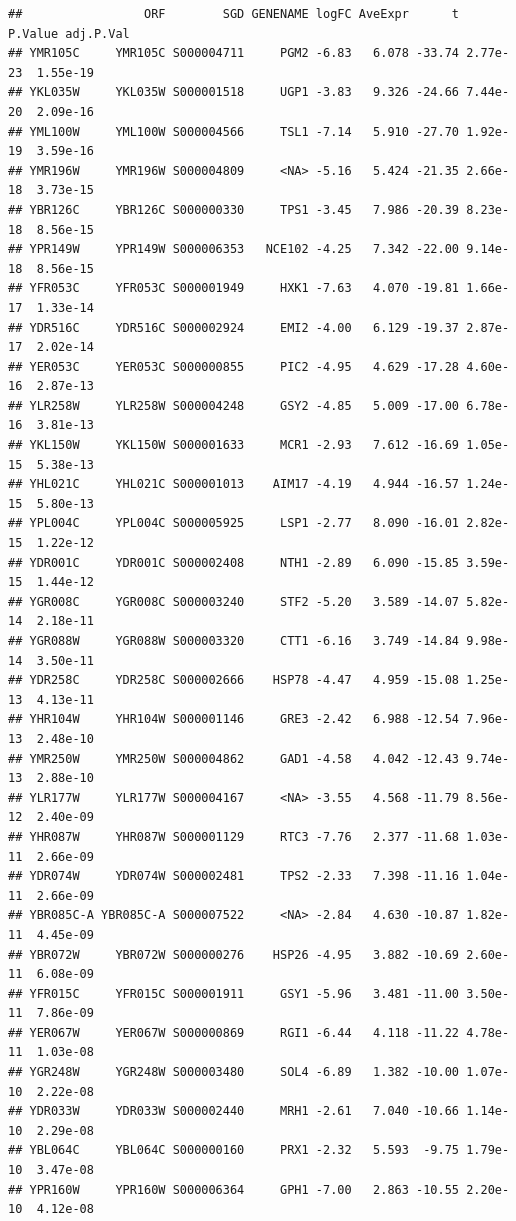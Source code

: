 \documentclass[
]{book}
\begin{document}
\begin{verbatim}
##                 ORF        SGD GENENAME logFC AveExpr      t  P.Value adj.P.Val
## YMR105C     YMR105C S000004711     PGM2 -6.83   6.078 -33.74 2.77e-23  1.55e-19
## YKL035W     YKL035W S000001518     UGP1 -3.83   9.326 -24.66 7.44e-20  2.09e-16
## YML100W     YML100W S000004566     TSL1 -7.14   5.910 -27.70 1.92e-19  3.59e-16
## YMR196W     YMR196W S000004809     <NA> -5.16   5.424 -21.35 2.66e-18  3.73e-15
## YBR126C     YBR126C S000000330     TPS1 -3.45   7.986 -20.39 8.23e-18  8.56e-15
## YPR149W     YPR149W S000006353   NCE102 -4.25   7.342 -22.00 9.14e-18  8.56e-15
## YFR053C     YFR053C S000001949     HXK1 -7.63   4.070 -19.81 1.66e-17  1.33e-14
## YDR516C     YDR516C S000002924     EMI2 -4.00   6.129 -19.37 2.87e-17  2.02e-14
## YER053C     YER053C S000000855     PIC2 -4.95   4.629 -17.28 4.60e-16  2.87e-13
## YLR258W     YLR258W S000004248     GSY2 -4.85   5.009 -17.00 6.78e-16  3.81e-13
## YKL150W     YKL150W S000001633     MCR1 -2.93   7.612 -16.69 1.05e-15  5.38e-13
## YHL021C     YHL021C S000001013    AIM17 -4.19   4.944 -16.57 1.24e-15  5.80e-13
## YPL004C     YPL004C S000005925     LSP1 -2.77   8.090 -16.01 2.82e-15  1.22e-12
## YDR001C     YDR001C S000002408     NTH1 -2.89   6.090 -15.85 3.59e-15  1.44e-12
## YGR008C     YGR008C S000003240     STF2 -5.20   3.589 -14.07 5.82e-14  2.18e-11
## YGR088W     YGR088W S000003320     CTT1 -6.16   3.749 -14.84 9.98e-14  3.50e-11
## YDR258C     YDR258C S000002666    HSP78 -4.47   4.959 -15.08 1.25e-13  4.13e-11
## YHR104W     YHR104W S000001146     GRE3 -2.42   6.988 -12.54 7.96e-13  2.48e-10
## YMR250W     YMR250W S000004862     GAD1 -4.58   4.042 -12.43 9.74e-13  2.88e-10
## YLR177W     YLR177W S000004167     <NA> -3.55   4.568 -11.79 8.56e-12  2.40e-09
## YHR087W     YHR087W S000001129     RTC3 -7.76   2.377 -11.68 1.03e-11  2.66e-09
## YDR074W     YDR074W S000002481     TPS2 -2.33   7.398 -11.16 1.04e-11  2.66e-09
## YBR085C-A YBR085C-A S000007522     <NA> -2.84   4.630 -10.87 1.82e-11  4.45e-09
## YBR072W     YBR072W S000000276    HSP26 -4.95   3.882 -10.69 2.60e-11  6.08e-09
## YFR015C     YFR015C S000001911     GSY1 -5.96   3.481 -11.00 3.50e-11  7.86e-09
## YER067W     YER067W S000000869     RGI1 -6.44   4.118 -11.22 4.78e-11  1.03e-08
## YGR248W     YGR248W S000003480     SOL4 -6.89   1.382 -10.00 1.07e-10  2.22e-08
## YDR033W     YDR033W S000002440     MRH1 -2.61   7.040 -10.66 1.14e-10  2.29e-08
## YBL064C     YBL064C S000000160     PRX1 -2.32   5.593  -9.75 1.79e-10  3.47e-08
## YPR160W     YPR160W S000006364     GPH1 -7.00   2.863 -10.55 2.20e-10  4.12e-08

\end{verbatim}
\end{document}
